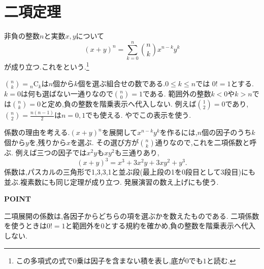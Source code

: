 
\section{二項定理}\label{節：二項定理}
非負の整数$n$と実数$x,y$について
\[
  (x+y)^n=\sum_{k=0}^n\binom nk x^{n-k}y^k
\]
が成り立つ.これをという.\footnote{この多項式の式で0乗は因子を含まない積を表し,底が$0$でも$1$と読む.}

$\binom nk={}_n\mathrm C_k$は$n$個から$k$個を選ぶ組合せの数である.$0\le k\le n$では
\BookMathLayout{\[
    \binom nk=\frac{n!}{k!(n-k)!}
    =\frac{n(n-1)\cdots(n-k+1)}{k!}
  \]}{\[
    \begin{aligned}
      \binom nk&=\frac{n!}{k!(n-k)!}\\
      &=\frac{n(n-1)\cdots(n-k+1)}{k!}.
    \end{aligned}
  \]}
$0!=1$とする.$k=0$は何も選ばない一通りなので$\binom n0=1$である.
範囲外の整数$k<0$や$k>n$では$\binom nk=0$と定め,負の整数を階乗表示へ代入しない.
例えば$\binom12=0$であり,$\binom n2=\frac{n(n-1)}{2}$は$n=0,1$でも使える.
やでこの表示を使う.

係数の理由を考える.$(x+y)^n$を展開して$x^{n-k}y^k$を作るには,$n$個の因子のうち$k$個から$y$を,残りから$x$を選ぶ.
その選び方が$\binom nk$通りなので,これを二項係数と呼ぶ.
例えば三つの因子では$x^2y$も$xy^2$も三通りあり,
\[
  (x+y)^3=x^3+3x^2y+3xy^2+y^3.
\]
係数は,パスカルの三角形で1,3,3,1と並ぶ段(最上段の1を0段目として3段目)にも並ぶ.複素数にも同じ定理が成り立つ.
発展演習の数え上げにも使う.

\begin{bookpoint}
  \textbf{POINT}\par
  二項展開の係数は,各因子からどちらの項を選ぶかを数えたものである.
  二項係数を使うときは$0!=1$と範囲外を0とする規約を確かめ,負の整数を階乗表示へ代入しない.
\end{bookpoint}
